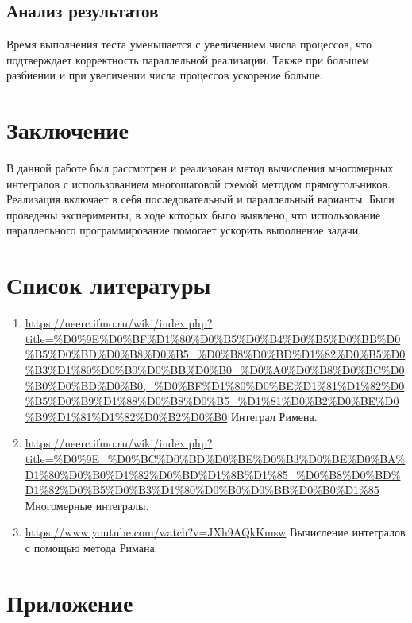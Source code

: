 \documentclass[12pt]{article}
\begin{document}
\subsection*{Анализ результатов}
Время выполнения теста уменьшается с увеличением числа процессов, что подтверждает корректность параллельной реализации. Также при большем разбиении и при увеличении числа процессов ускорение
больше.

\newpage
\section*{Заключение}
В данной работе был рассмотрен и реализован  метод вычисления многомерных интегралов с использованием многошаговой схемой методом прямоугольников. Реализация включает в себя  последовательный и параллельный варианты. Были проведены эксперименты, в ходе которых было выявлено, что использование параллельного программирование помогает ускорить выполнение задачи.

\newpage
\section*{Список литературы}
\begin{enumerate}
    \item \url{https://neerc.ifmo.ru/wiki/index.php?title=%D0%9E%D0%BF%D1%80%D0%B5%D0%B4%D0%B5%D0%BB%D0%B5%D0%BD%D0%B8%D0%B5_%D0%B8%D0%BD%D1%82%D0%B5%D0%B3%D1%80%D0%B0%D0%BB%D0%B0_%D0%A0%D0%B8%D0%BC%D0%B0%D0%BD%D0%B0,_%D0%BF%D1%80%D0%BE%D1%81%D1%82%D0%B5%D0%B9%D1%88%D0%B8%D0%B5_%D1%81%D0%B2%D0%BE%D0%B9%D1%81%D1%82%D0%B2%D0%B0}{ Интеграл Римена}.
    \item \url{https://neerc.ifmo.ru/wiki/index.php?title=%D0%9E_%D0%BC%D0%BD%D0%BE%D0%B3%D0%BE%D0%BA%D1%80%D0%B0%D1%82%D0%BD%D1%8B%D1%85_%D0%B8%D0%BD%D1%82%D0%B5%D0%B3%D1%80%D0%B0%D0%BB%D0%B0%D1%85}{ Многомерные интегралы}.
    \item \url{https://www.youtube.com/watch?v=JXh9AQkKmsw}{ Вычисление интегралов с помощью метода Римана}.
\end{enumerate}
\newpage
\section*{Приложение}
\end{document}
